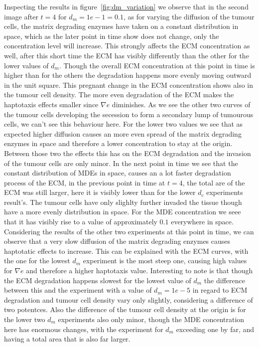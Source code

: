 Inspecting the results in figure~\ref{fig:dm_variation} we observe that in the second image after $t=4$ for $d_m=1e-1=0.1$, as for varying the diffusion of the tumour cells, the matrix degrading enzymes have taken on a constant distribution in space, which as the later point in time show does not change, only the concentration level will increase. This strongly affects the ECM concentration as well, after this short time the ECM has visibly differently than the other for the lower values of $d_m$. Though the overall ECM concentration at this point in time is higher than for the others the degradation happens more evenly moving outward in the unit square. This pregnant change in the ECM concentration shows also in the tumour cell density. The more even degradation of the ECM makes the haptotaxis effects smaller since $\nabla e$ diminishes. As we see the other two curves of the tumour cells developing the secession to form a secondary lump of tumourous cells, we can't see this behaviour here.
For the lower two values we see that as expected higher diffusion causes an more even spread of the matrix degrading enzymes in space and therefore a lower concentration to stay at the origin. Between those two the effects this has on the ECM degradation and the invasion of the tumour cells are only minor. \newline 
In the next point in time we see that the constant distribution of MDEs in space, causes an a lot faster degradation process of the ECM, in the previous point in time at $t=4$, the total are of the ECM was still larger, here it is visibly lower than for the lower $d_c$ experiments result's. The tumour cells have only slighlty further invaded the tissue though have a more evenly distribution in space. For the MDE concentration we seee that it has visibly rise to a value of approximately $0.1$ everywhere in space. 
Considering the results of the other two experiments at this point in time, we can observe that a very slow diffusion of the matrix degrading enzymes causes haptotatic effects to increase. This can be explained with the ECM curves, with the one for the lowest $d_m$ experiment is the most steep one, causing high values for $\nabla e$ and therefore a higher haptotaxis value. Interesting to note is that though the ECM degradation happens slowest for the lowest value of $d_m$ the difference between this and the experiment with a value of $d_m=1e-5$ in regard to ECM degradation and tumour cell density vary only slightly, considering a difference of two potentces. Also the difference of the tumour cell density at the origin is for the lower two $d_m$ experiments also only minor, though the MDE concentration here has enormous changes, with the experiment for $d_m$ exceeding one by far, and having a total area that is also far larger. \newline 
